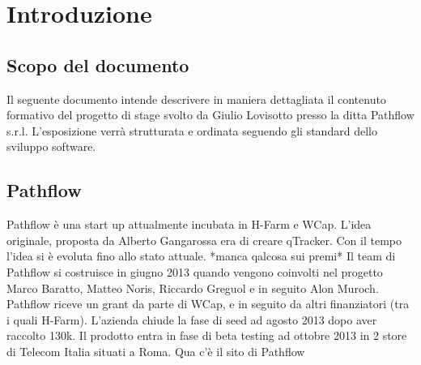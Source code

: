
\section{Introduzione} \label{sec:greetings}
\subsection{Scopo del documento} %
Il seguente documento intende descrivere in maniera dettagliata il contenuto formativo del progetto di stage svolto da Giulio Lovisotto presso la ditta Pathflow s.r.l. L'esposizione verrà strutturata e ordinata seguendo gli standard dello sviluppo software. 

\subsection{Pathflow} \label{ssec:pathflow}
Pathflow è una start up attualmente incubata in H-Farm e WCap. L'idea originale, proposta da Alberto Gangarossa era di creare qTracker. Con il tempo l'idea si è evoluta fino allo stato attuale. 
*manca qalcosa sui premi*
Il team di Pathflow si costruisce in giugno 2013 quando vengono coinvolti nel progetto Marco Baratto, Matteo Noris, Riccardo Greguol e in seguito Alon Muroch. Pathflow riceve un grant da parte di WCap, e in seguito da altri finanziatori (tra i quali H-Farm). L'azienda chiude la fase di seed ad agosto 2013 dopo aver raccolto 130k. Il prodotto entra in fase di beta testing ad ottobre 2013 in 2 store di Telecom Italia situati a Roma.
Qua c'è il sito di Pathflow \cite{pathflow.co}

